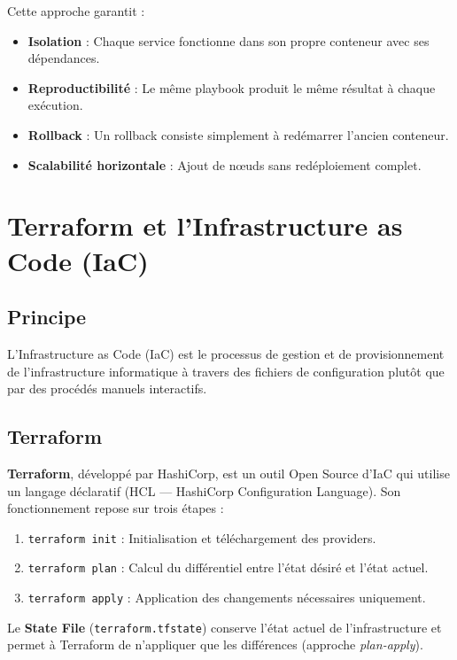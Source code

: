 \documentclass[12pt,a4paper,oneside]{book}
\begin{document}
Cette approche garantit :
\begin{itemize}
    \item \textbf{Isolation} : Chaque service fonctionne dans son propre conteneur avec ses d\'ependances.
    \item \textbf{Reproductibilit\'e} : Le m\^eme playbook produit le m\^eme r\'esultat \`a chaque ex\'ecution.
    \item \textbf{Rollback} : Un rollback consiste simplement \`a red\'emarrer l'ancien conteneur.
    \item \textbf{Scalabilit\'e horizontale} : Ajout de n\oe{}uds sans red\'eploiement complet.
\end{itemize}

\section{Terraform et l'Infrastructure as Code (IaC)}

\subsection{Principe}
L'Infrastructure as Code (IaC) est le processus de gestion et de provisionnement de l'infrastructure informatique \`a travers des fichiers de configuration plut\^ot que par des proc\'ed\'es manuels interactifs.

\subsection{Terraform}
\textbf{Terraform}, d\'evelopp\'e par HashiCorp, est un outil Open Source d'IaC qui utilise un langage d\'eclaratif (HCL --- HashiCorp Configuration Language). Son fonctionnement repose sur trois \'etapes :
\begin{enumerate}
    \item \texttt{terraform init} : Initialisation et t\'el\'echargement des providers.
    \item \texttt{terraform plan} : Calcul du diff\'erentiel entre l'\'etat d\'esir\'e et l'\'etat actuel.
    \item \texttt{terraform apply} : Application des changements n\'ecessaires uniquement.
\end{enumerate}

Le \textbf{State File} (\texttt{terraform.tfstate}) conserve l'\'etat actuel de l'infrastructure et permet \`a Terraform de n'appliquer que les diff\'erences (approche \textit{plan-apply}).
\end{document}
